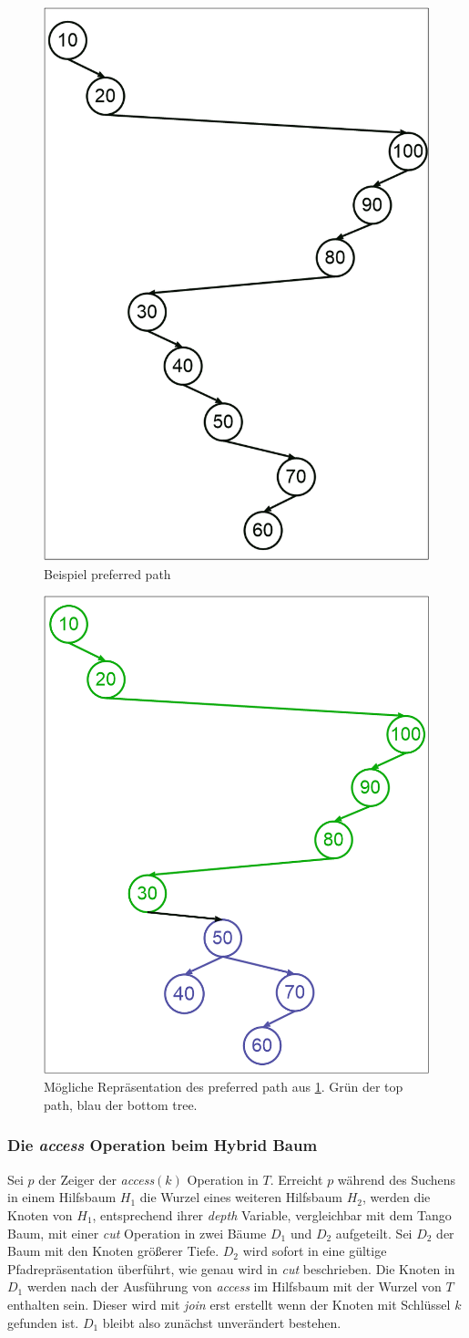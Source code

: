 \documentclass[a4paper,12pt]{article}
\begin{document}
\begin{figure}[h]
	\centering
	\includegraphics[height= 0.5\textwidth]{"Medien/Zipper/preferredPath"}
	\caption{Beispiel preferred path }
	\label{fig:preferredPath}
\end{figure} 
\begin{figure}[h]
	\centering
	\includegraphics[height= 0.5\textwidth]{"Medien/Zipper/hybrid/pathRepresentation"}
	\caption{Mögliche Repräsentation des preferred path aus \ref{fig:preferredPath}. Grün der top path, blau der bottom tree. }
	\label{fig:pathRepresentation}
\end{figure} 


 \subsubsection{Die \textit{access} Operation beim Hybrid Baum}
Sei $p$ der Zeiger der \textit{access}$\left(k\right)$ Operation in $T$. Erreicht $p$ während des Suchens in einem Hilfsbaum $H_1$ die Wurzel eines weiteren Hilfsbaum $H_2$, werden die Knoten von $H_1$, entsprechend ihrer \textit{depth} Variable, vergleichbar mit dem Tango Baum,  mit einer \textit{cut} Operation in zwei Bäume $D_1$ und $D_2$ aufgeteilt. Sei $D_2$ der Baum mit den Knoten größerer Tiefe. $D_2$ wird sofort in eine gültige Pfadrepräsentation überführt, wie genau wird in \textit{cut} beschrieben. Die Knoten in $D_1$ werden nach der Ausführung von \textit{access} im Hilfsbaum mit der Wurzel von $T$ enthalten sein. Dieser wird mit \textit{join} erst erstellt wenn der Knoten mit Schlüssel $k$ gefunden ist. $D_1$ bleibt also zunächst unverändert bestehen.       
\end{document}
